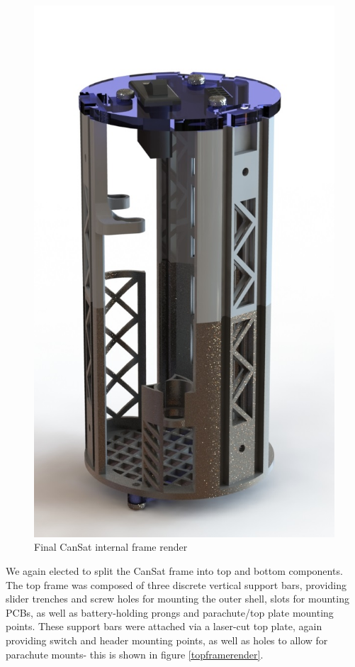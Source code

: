 \documentclass[]{report}
\begin{document}
		\begin{figure}[h]
			\hfill\includegraphics[scale=0.4]{cansat_internal_frame_render.jpg}\hspace*{\fill}
			\caption{Final CanSat internal frame render}
			\label{newframerender}
		\end{figure}
		
		We again elected to split the CanSat frame into top and bottom components. The top frame was composed of three discrete vertical support bars, providing slider trenches and screw holes for mounting the outer shell, slots for mounting PCBs, as well as battery-holding prongs and parachute/top plate mounting points. These support bars were attached via a laser-cut top plate, again providing switch and header mounting points, as well as holes to allow for parachute mounts- this is shown in figure \ref{topframerender}.
		
\end{document}
